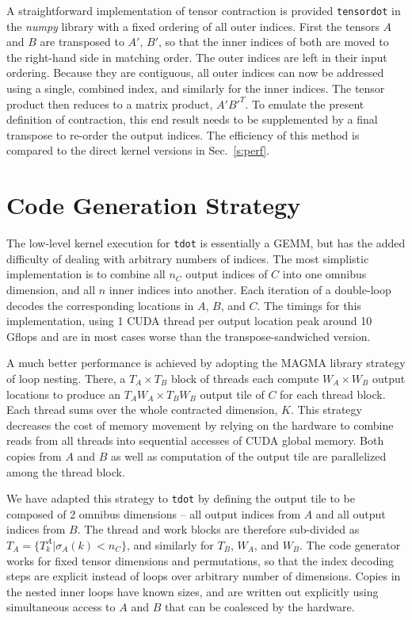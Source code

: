 \documentclass[preprint]{sigplanconf}
\begin{document}
  A straightforward implementation of tensor contraction is provided {\tt tensordot} in the {\em numpy} library
with a fixed ordering of all outer indices.\cite{numpy}
First the tensors $A$ and $B$ are transposed to $A'$, $B'$,
so that the inner indices of both are moved to the right-hand side in matching order.
The outer indices are left in their input ordering.  Because they are contiguous, all outer indices
can now be addressed using a single, combined index, and similarly for the inner indices.
The tensor product then reduces to a matrix product, $A' B'^T$.
To emulate the present definition of contraction, this end result needs to be supplemented
by a final transpose to re-order the output indices.  The efficiency of this method is compared to the
direct kernel versions in Sec.~\ref{s:perf}.

\section{ Code Generation Strategy}\label{s:gen}

  The low-level kernel execution for {\tt tdot} is essentially a GEMM, but
has the added difficulty of dealing with arbitrary numbers of indices.
The most simplistic implementation is to combine all $n_C$ output indices
of $C$ into one omnibus dimension, and all $n$ inner indices
into another.  Each iteration of a double-loop decodes the corresponding
locations in $A$, $B$, and $C$.  The timings for this implementation, using
1 CUDA thread per output location peak around 10 Gflops and are in most cases
worse than the transpose-sandwiched version.

  A much better performance is achieved by adopting the MAGMA library
strategy of loop nesting.\cite{magma}  There, a $T_A \times T_B$ block of threads each
compute $W_A \times W_B$ output locations to produce an $T_A W_A \times T_B W_B$
output tile of $C$ for each thread block.  Each thread sums over the whole contracted
dimension, $K$.  This strategy decreases the cost of memory movement by relying on the
hardware to combine reads from all threads into sequential accesses of CUDA global memory.
Both copies from $A$ and $B$ as well
as computation of the output tile are parallelized among the thread block.

  We have adapted this strategy to {\tt tdot} by defining the output tile
to be composed of 2 omnibus dimensions -- all output indices from $A$
and all output indices from $B$.  The thread and work blocks are therefore sub-divided as
$T_A = \{T^A_k | \sigma_A(k) < n_C\}$, and similarly for $T_B$, $W_A$, and $W_B$.
The code generator works for fixed tensor dimensions and permutations, so that
the index decoding steps are explicit instead of loops over arbitrary number of dimensions.
Copies in the nested inner loops have known sizes, and are written out explicitly
using simultaneous access to $A$ and $B$ that can be coalesced by the hardware.
\end{document}
